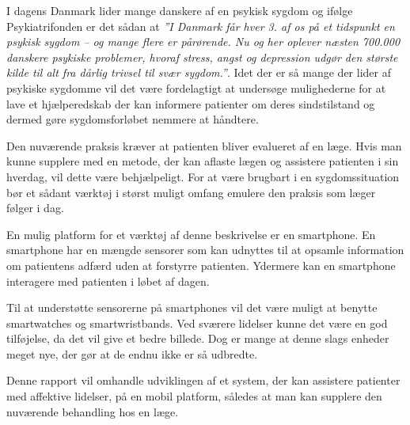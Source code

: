 


I dagens Danmark lider mange danskere af en psykisk sygdom og ifølge Psykiatrifonden er det sådan at \textit{''I Danmark får hver 3. af os på et tidspunkt en psykisk sygdom – og mange flere er pårørende. 
Nu og her oplever næsten 700.000 danskere psykiske problemer, hvoraf stress, angst og depression udgør den største kilde til alt fra dårlig trivsel til svær sygdom.''}\citep{psykiatrifonden}.
Idet der er så mange der lider af psykiske sygdomme vil det være fordelagtigt at undersøge mulighederne for at lave et hjælperedskab der kan informere patienter om deres sindstilstand og dermed gøre sygdomsforløbet nemmere at håndtere.

Den nuværende praksis kræver at patienten bliver evalueret af en læge.
Hvis man kunne supplere med en metode, der kan aflaste lægen og assistere patienten i sin hverdag, vil dette være behjælpeligt. 
For at være brugbart i en sygdomssituation bør et sådant værktøj i størst muligt omfang emulere den praksis som læger følger i dag.

En mulig platform for et værktøj af denne beskrivelse er en smartphone.
En smartphone har en mængde sensorer som kan udnyttes til at opsamle information om patientens adfærd uden at forstyrre patienten.
Ydermere kan en smartphone interagere med patienten i løbet af dagen. 

Til at understøtte sensorerne på smartphones vil det være muligt at benytte smartwatches og smartwristbands.
Ved sværere lidelser kunne det være en god tilføjelse, da det vil give et bedre billede.
Dog er mange at denne slags enheder meget nye, der gør at de endnu ikke er så udbredte.

Denne rapport vil omhandle udviklingen af et system, der kan assistere patienter med affektive lidelser, på en mobil platform, således at man kan supplere den nuværende behandling hos en læge.